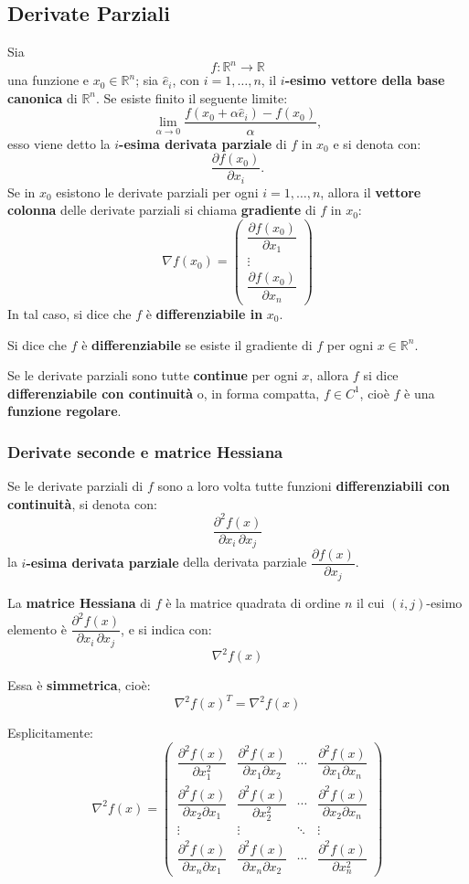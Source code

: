 \subsection{Derivate Parziali}
Sia 
\[
f : \mathbb{R}^n \to \mathbb{R}
\]
una funzione e $x_0 \in \mathbb{R}^n$; sia $\hat{e}_i$, con $i = 1, \ldots, n$, il \textbf{$i$-esimo vettore della base canonica} di $\mathbb{R}^n$.
Se esiste finito il seguente limite:
\[
\lim_{\alpha \to 0} \frac{f(x_0 + \alpha \hat{e}_i) - f(x_0)}{\alpha},
\]
esso viene detto la \textbf{$i$-esima derivata parziale} di $f$ in $x_0$ e si denota con:
\[
\frac{\partial f(x_0)}{\partial x_i}.
\]
Se in $x_0$ esistono le derivate parziali per ogni $i = 1, \ldots, n$, allora il \textbf{vettore colonna} delle derivate parziali si chiama \textbf{gradiente} di $f$ in $x_0$:
\[
\nabla f(x_0) =
\begin{pmatrix}
\dfrac{\partial f(x_0)}{\partial x_1} \\[6pt]
\vdots \\[4pt]
\dfrac{\partial f(x_0)}{\partial x_n}
\end{pmatrix}
\]
In tal caso, si dice che $f$ è \textbf{differenziabile in} $x_0$.

Si dice che $f$ è \textbf{differenziabile} se esiste il gradiente di $f$ per ogni $x \in \mathbb{R}^n$.

Se le derivate parziali sono tutte \textbf{continue} per ogni $x$, allora $f$ si dice \textbf{differenziabile con continuità} o, in forma compatta, $f \in C^1$, cioè $f$ è una \textbf{funzione regolare}.

\subsubsection{Derivate seconde e matrice Hessiana}
Se le derivate parziali di $f$ sono a loro volta tutte funzioni \textbf{differenziabili con continuità}, si denota con:
\[
\frac{\partial^2 f(x)}{\partial x_i \, \partial x_j}
\]
la \textbf{$i$-esima derivata parziale} della derivata parziale $\dfrac{\partial f(x)}{\partial x_j}$.

La \textbf{matrice Hessiana} di $f$ è la matrice quadrata di ordine $n$ il cui $(i,j)$-esimo elemento è $\dfrac{\partial^2 f(x)}{\partial x_i \, \partial x_j}$, e si indica con:
\[
\nabla^2 f(x)
\]

Essa è \textbf{simmetrica}, cioè:
\[
\nabla^2 f(x)^{T} = \nabla^2 f(x)
\]

Esplicitamente:
\[
\nabla^2 f(x) =
\begin{pmatrix}
\dfrac{\partial^2 f(x)}{\partial x_1^2} & \dfrac{\partial^2 f(x)}{\partial x_1 \partial x_2} & \cdots & \dfrac{\partial^2 f(x)}{\partial x_1 \partial x_n} \\[8pt]
\dfrac{\partial^2 f(x)}{\partial x_2 \partial x_1} & \dfrac{\partial^2 f(x)}{\partial x_2^2} & \cdots & \dfrac{\partial^2 f(x)}{\partial x_2 \partial x_n} \\[8pt]
\vdots & \vdots & \ddots & \vdots \\[8pt]
\dfrac{\partial^2 f(x)}{\partial x_n \partial x_1} & \dfrac{\partial^2 f(x)}{\partial x_n \partial x_2} & \cdots & \dfrac{\partial^2 f(x)}{\partial x_n^2}
\end{pmatrix}
\]

